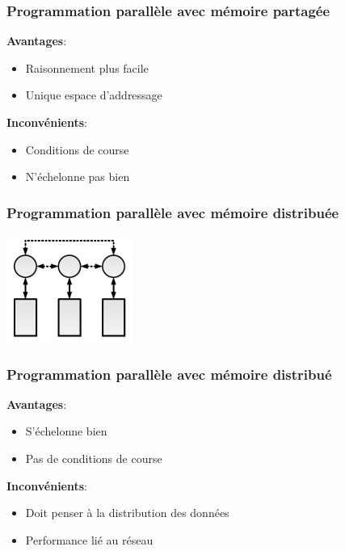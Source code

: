 \documentclass{beamer}
\begin{document}
\begin{frame}
\frametitle{Programmation parallèle avec mémoire partagée}
\begin{minipage}[t]{0.5\linewidth}
    \textbf{Avantages}:
    \begin{itemize}
    \item{Raisonnement plus facile}
    \item{Unique espace d'addressage}
    \end{itemize}
    \end{minipage}%
    \begin{minipage}[t]{0.5\linewidth}
    \textbf{Inconvénients}:
    \begin{itemize}
    \item{Conditions de course}
    \item{N'échelonne pas bien}
    \end{itemize}
\end{minipage}
\end{frame}

\begin{frame}
\frametitle{Programmation parallèle avec mémoire distribuée}
\begin{center}
\includegraphics[scale=3]{distributed.png}
\end{center}
\end{frame}

\begin{frame}
\frametitle{Programmation parallèle avec mémoire distribué}
\begin{minipage}[t]{0.5\linewidth}
    \textbf{Avantages}:
    \begin{itemize}
    \item{S'échelonne bien}
    \item{Pas de conditions de course}
    \end{itemize}
    \end{minipage}%
    \begin{minipage}[t]{0.5\linewidth}
    \textbf{Inconvénients}:
    \begin{itemize}
    \item{Doit penser à la distribution des données}
    \item{Performance lié au réseau}
    \end{itemize}
\end{minipage}
\end{frame}
\end{document}
